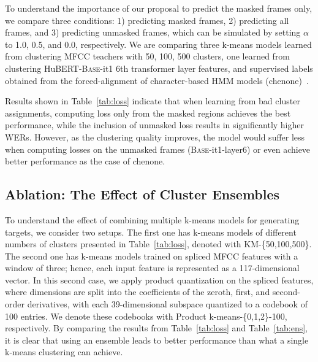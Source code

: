 To understand the importance of our proposal to predict the masked frames only, we compare three conditions: 1) predicting masked frames, 2) predicting all frames, and 3) predicting unmasked frames, which can be simulated by setting $\alpha$ to 1.0, 0.5, and 0.0, respectively. 
We are comparing three k-means models learned from clustering MFCC teachers with 50, 100, 500 clusters, one learned from clustering HuBERT-\textsc{Base}-it1 6th transformer layer features, and supervised labels obtained from the forced-alignment of character-based HMM models (chenone)~\cite{le2019senones}.

Results shown in Table~\ref{tab:loss} indicate that when learning from bad cluster assignments, computing loss only from the masked regions achieves the best performance, while the inclusion of unmasked loss results in significantly higher WERs. 
However, as the clustering quality improves, the model would suffer less when computing losses on the unmasked frames (\textsc{Base}-it1-layer6) or even achieve better performance as the case of chenone.

\subsection{Ablation: The Effect of Cluster Ensembles}
To understand the effect of combining multiple k-means models for generating targets, we consider two setups. The first one has k-means models of different numbers of clusters presented in Table~\ref{tab:loss}, denoted with KM-\{50,100,500\}. The second one has k-means models trained on spliced MFCC features with a window of three; hence, each input feature is represented as a 117-dimensional vector. In this second case, we apply product quantization on the spliced features, where dimensions are split into the coefficients of the zeroth, first, and second-order derivatives, with each 39-dimensional subspace quantized to a codebook of 100 entries. We denote these codebooks with Product k-means-\{0,1,2\}-100, respectively.
By comparing the results from Table~\ref{tab:loss} and Table~\ref{tab:ens}, it is clear that using an ensemble leads to better performance than what a single k-means clustering can achieve.

